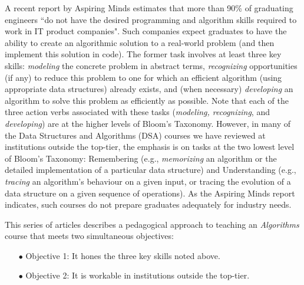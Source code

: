 \begin{multicols}{2}
A recent report by Aspiring Minds \cite{art2-key01} estimates that more than 90\% of graduating engineers ``do not have the desired programming and algorithm skills required to work in IT product companies". Such companies expect graduates to have the ability to create an algorithmic solution to a real-world problem (and then implement this solution in code). The former task involves at least three key skills: \textit{modeling} the concrete problem in abstract terms, \textit{recognizing} opportunities (if any) to reduce this problem to one for which an efficient algorithm (using appropriate data structures) already exists, and (when necessary) \textit{developing} an algorithm to solve this problem as efficiently as possible. Note that each of the three action verbs associated with these tasks (\textit{modeling, recognizing}, and \textit{developing}) are at the higher levels of Bloom's Taxonomy. However, in many of the Data Structures and Algorithms (DSA) courses we have reviewed at institutions outside the top-tier, the emphasis is on tasks at the two lowest level of Bloom's Taxonomy: Remembering (e.g., \textit{memorizing} an algorithm or the detailed implementation of a particular data structure) and Understanding (e.g., \textit{tracing} an algorithm's behaviour on a given input, or tracing the evolution of a data structure on a given sequence of operations). As the Aspiring Minds report \cite{art2-key01} indicates, such courses do not prepare graduates adequately for industry needs.

This series of articles describes a pedagogical approach to teaching an \textit{Algorithms} course that meets two simultaneous objectives:

\vspace{-.2cm}

\begin{itemize}  
\item[$\bullet$] Objective 1: It hones the three key skills noted above.\\[-.4cm]
\item[$\bullet$] Objective 2: It is workable in institutions outside the top-tier.\\[-.4cm]
\end{itemize}
  
\vspace{-.2cm}  
  

\end{multicols}
